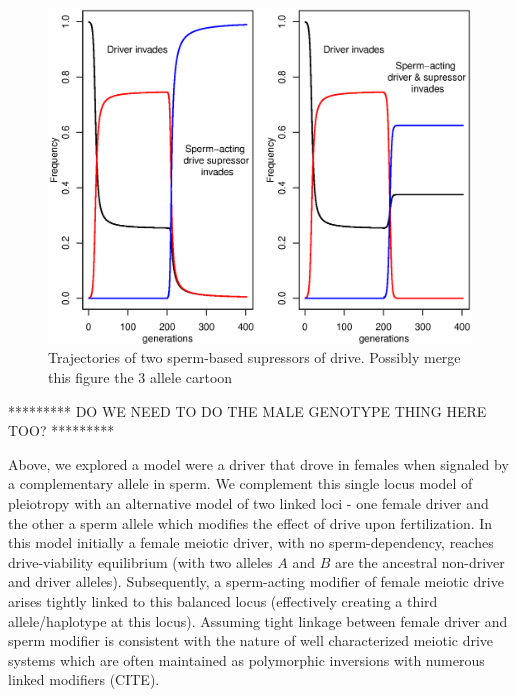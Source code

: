 \documentclass[12pt,letterpaper]{article}
\newcommand{\yb}[1]{{ \color{blue} #1}}
\begin{document}
\begin{figure}
\includegraphics[width = 0.8 \textwidth]{Figures/trajectories_of_sperm_based_supressors.eps} 
\caption{Trajectories of two sperm-based supressors of drive. Possibly
merge this figure the 3 allele cartoon}  \label{Trajectories_of_supressors}
\end{figure}














\yb{********* DO WE NEED TO DO THE MALE GENOTYPE THING HERE TOO? *********}

Above, we explored a model were a driver that drove in females when signaled by a complementary allele in sperm.  
We complement this single locus model  of pleiotropy with an alternative model of two linked loci - one female driver and the other a sperm allele which modifies the effect of drive upon fertilization. 
In this model initially a female meiotic driver, with no sperm-dependency, reaches drive-viability equilibrium (with two alleles
$A$ and $B$ are the ancestral non-driver and driver alleles).
Subsequently, a sperm-acting modifier of female meiotic drive arises tightly
        linked to this balanced locus (effectively creating a third
        allele/haplotype at this locus).
Assuming tight linkage between female driver and sperm modifier is consistent with the nature of well characterized meiotic drive systems 
	which are often maintained as polymorphic inversions with numerous linked modifiers (CITE).
\end{document}
